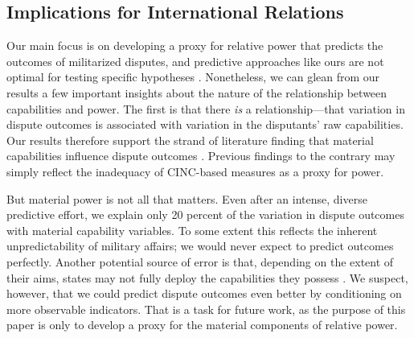\subsection{Implications for International Relations}

Our main focus is on developing a proxy for relative power that predicts the outcomes of militarized disputes, and predictive approaches like ours are not optimal for testing specific hypotheses \citep{Shmueli:2010jd}.
Nonetheless, we can glean from our results a few important insights about the nature of the relationship between capabilities and power.
The first is that there \emph{is} a relationship---that variation in dispute outcomes is associated with variation in the disputants' raw capabilities.
Our results therefore support the strand of literature finding that material capabilities influence dispute outcomes \citep{wartrap,Stam:1996wl,Sullivan:2012vi}.
Previous findings to the contrary \citep[e.g.,][]{Cannizzo:1980vz,Maoz:1983cw} may simply reflect the inadequacy of CINC-based measures as a proxy for power.

But material power is not all that matters.
Even after an intense, diverse predictive effort, we explain only 20 percent of the variation in dispute outcomes with material capability variables.
To some extent this reflects the inherent unpredictability of military affairs; we would never expect to predict outcomes perfectly.
Another potential source of error is that, depending on the extent of their aims, states may not fully deploy the capabilities they possess \citep{sullivan2007war}.
We suspect, however, that we could predict dispute outcomes even better by conditioning on more observable indicators.
That is a task for future work, as the purpose of this paper is only to develop a proxy for the material components of relative power.

\begin{table}[tp]
  \centering
  
  \caption{%
    Percentage increases in loss, relative to the full ensemble, due to removing each capability component from the analysis.
    The results ``without year'' come from running the super learner on only the 16 component models without the year variable.
  }
  \label{tab:varimp}
\end{table}


